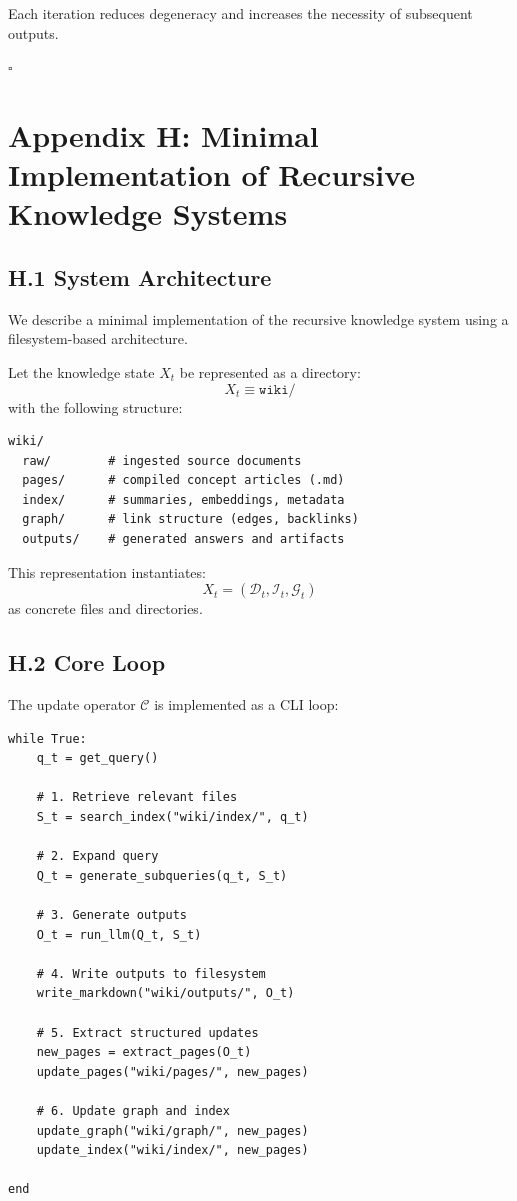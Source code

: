 \documentclass[12pt, oneside]{article}
\theoremstyle{plain}
\theoremstyle{definition}
\theoremstyle{remark}
\begin{document}
Each iteration reduces degeneracy and increases the necessity of subsequent outputs.

\hfill $\square$

\section{Appendix H: Minimal Implementation of Recursive Knowledge Systems}

\subsection{H.1 System Architecture}

We describe a minimal implementation of the recursive knowledge system using a filesystem-based architecture.

Let the knowledge state $X_t$ be represented as a directory:
\[
X_t \equiv \texttt{wiki/}
\]
with the following structure:
\begin{verbatim}
wiki/
  raw/        # ingested source documents
  pages/      # compiled concept articles (.md)
  index/      # summaries, embeddings, metadata
  graph/      # link structure (edges, backlinks)
  outputs/    # generated answers and artifacts
\end{verbatim}

This representation instantiates:
\[
X_t = (\mathcal{D}_t, \mathcal{I}_t, \mathcal{G}_t)
\]
as concrete files and directories.

\subsection{H.2 Core Loop}

The update operator $\mathcal{C}$ is implemented as a CLI loop:

\begin{tcolorbox}[colback=lightgray, colframe=black, title=Main Loop]
\begin{verbatim}
while True:
    q_t = get_query()

    # 1. Retrieve relevant files
    S_t = search_index("wiki/index/", q_t)

    # 2. Expand query
    Q_t = generate_subqueries(q_t, S_t)

    # 3. Generate outputs
    O_t = run_llm(Q_t, S_t)

    # 4. Write outputs to filesystem
    write_markdown("wiki/outputs/", O_t)

    # 5. Extract structured updates
    new_pages = extract_pages(O_t)
    update_pages("wiki/pages/", new_pages)

    # 6. Update graph and index
    update_graph("wiki/graph/", new_pages)
    update_index("wiki/index/", new_pages)

end
\end{verbatim}
\end{tcolorbox}
\end{document}

